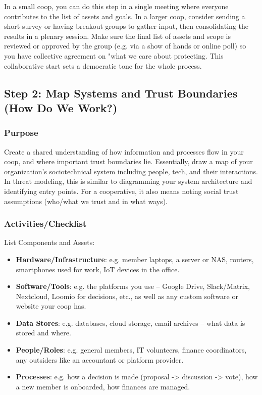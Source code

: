 In a small coop, you can do this step in a single meeting where everyone
contributes to the list of assets and goals. In a larger coop, consider sending
a short survey or having breakout groups to gather input, then consolidating the
results in a plenary session. Make sure the final list of assets and scope is
reviewed or approved by the group (e.g. via a show of hands or online poll) so
you have collective agreement on "what we care about protecting. This
collaborative start sets a democratic tone for the whole process.

\subsection{Step 2: Map Systems and Trust Boundaries (How Do We Work?)}
\label{subsec:Step2}

\subsubsection{Purpose}

Create a shared understanding of how information and processes flow in your
coop, and where important trust boundaries lie. Essentially, draw a map of your
organization's sociotechnical system including people, tech, and their
interactions. In threat modeling, this is similar to diagramming your system
architecture and identifying entry points. For a cooperative, it also means
noting social trust assumptions (who/what we trust and in what ways).

\subsubsection{Activities/Checklist}

List Components and Assets:

\begin{itemize}
    \item \textbf{Hardware/Infrastructure}: e.g. member laptops, a server or
NAS, routers, smartphones used for work, IoT devices in the office.
    \item \textbf{Software/Tools}: e.g. the platforms you use – Google Drive,
Slack/Matrix, Nextcloud, Loomio for decisions, etc., as well as any custom
software or website your coop has.
    \item \textbf{Data Stores}: e.g. databases, cloud storage, email archives –
what data is stored and where.
    \item \textbf{People/Roles}: e.g. general members, IT volunteers, finance
coordinators, any outsiders like an accountant or platform provider.
    \item \textbf{Processes}: e.g. how a decision is made (proposal ->
discussion -> vote), how a new member is onboarded, how finances are managed.
\end{itemize}

